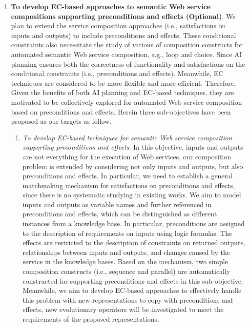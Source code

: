 \begin{enumerate}
 \item \textbf{To develop EC-based approaches to semantic Web service compositions supporting preconditions and effects (Optional)}. We plan to extend the service composition approaches (i.e., satisfactions on inputs and outputs) to include preconditions and effects. These conditional constraints also necessitate the study of various of composition constructs for automated semantic Web service composition, e.g., loop and choice. Since AI planning ensures both the correctness of functionality and satisfactions on the conditional constraints (i.e., preconditions and effects). Meanwhile, EC techniques are considered to be more flexible and more efficient. Therefore, Given the benefits of both AI planning and EC-based techniques, they are motivated to be collectively explored for automated Web service composition based on preconditions and effects. Herein three sub-objectives have been proposed as our targets as follow.
 
 \begin{enumerate}
 
  \item \emph{To develop EC-based techniques for semantic Web service composition supporting preconditions and effects}. In this objective, inputs and outputs are not everything for the execution of Web services, our composition problem is extended by considering not only inputs and outputs, but also preconditions and effects. In particular, we need to establish a general matchmaking mechanism for satisfactions on preconditions and effects, since there is no systematic studying in existing works. We aim to model inputs and outputs as variable names and further referenced in preconditions and effects, which can be distinguished as different instances from a knowledge base. In particular, preconditions are assigned to the description of requirements on inputs using logic formulas. The effects are restricted to the description of constraints on returned outputs, relationships between inputs and outputs, and changes caused by the service in the knowledge bases. Based on the mechanism, two simple composition constructs (i.e., sequence and parallel) are automatically constructed for supporting preconditions and effects in this sub-objective. Meanwhile, we aim to develop EC-based approaches to effectively handle this problem with new representations to copy with preconditions and effects, new evolutionary operators will be  investigated to meet the requirements of the proposed representations.


\end{enumerate}
\end{enumerate}
